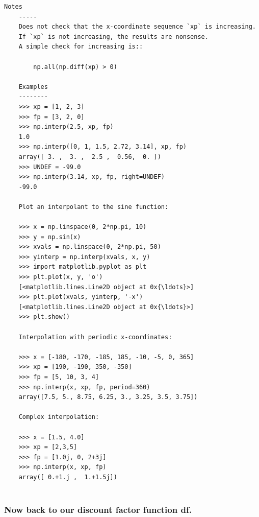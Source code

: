 \documentclass[11pt]{article}
\begin{document}
\begin{Verbatim}[commandchars=\\\{\}]
    Notes
    -----
    Does not check that the x-coordinate sequence `xp` is increasing.
    If `xp` is not increasing, the results are nonsense.
    A simple check for increasing is::
    
        np.all(np.diff(xp) > 0)
    
    Examples
    --------
    >>> xp = [1, 2, 3]
    >>> fp = [3, 2, 0]
    >>> np.interp(2.5, xp, fp)
    1.0
    >>> np.interp([0, 1, 1.5, 2.72, 3.14], xp, fp)
    array([ 3. ,  3. ,  2.5 ,  0.56,  0. ])
    >>> UNDEF = -99.0
    >>> np.interp(3.14, xp, fp, right=UNDEF)
    -99.0
    
    Plot an interpolant to the sine function:
    
    >>> x = np.linspace(0, 2*np.pi, 10)
    >>> y = np.sin(x)
    >>> xvals = np.linspace(0, 2*np.pi, 50)
    >>> yinterp = np.interp(xvals, x, y)
    >>> import matplotlib.pyplot as plt
    >>> plt.plot(x, y, 'o')
    [<matplotlib.lines.Line2D object at 0x{\ldots}>]
    >>> plt.plot(xvals, yinterp, '-x')
    [<matplotlib.lines.Line2D object at 0x{\ldots}>]
    >>> plt.show()
    
    Interpolation with periodic x-coordinates:
    
    >>> x = [-180, -170, -185, 185, -10, -5, 0, 365]
    >>> xp = [190, -190, 350, -350]
    >>> fp = [5, 10, 3, 4]
    >>> np.interp(x, xp, fp, period=360)
    array([7.5, 5., 8.75, 6.25, 3., 3.25, 3.5, 3.75])
    
    Complex interpolation:
    
    >>> x = [1.5, 4.0]
    >>> xp = [2,3,5]
    >>> fp = [1.0j, 0, 2+3j]
    >>> np.interp(x, xp, fp)
    array([ 0.+1.j ,  1.+1.5j])


    \end{Verbatim}

    \hypertarget{now-back-to-our-discount-factor-function-df.}{%
\subsubsection{Now back to our discount factor function
df.}\label{now-back-to-our-discount-factor-function-df.}}
\end{document}
